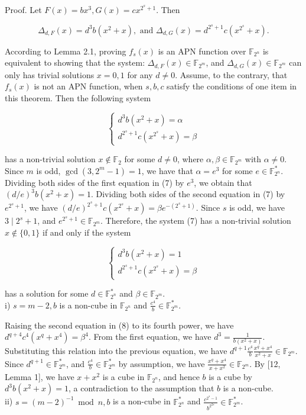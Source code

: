 \documentclass[10pt]{article}
\begin{document}
Proof. Let $F(x)=b x^{3}, G(x)=c x^{2^{s}+1}$. Then

$$
\Delta_{d, F}(x)=d^{3} b\left(x^{2}+x\right), \text { and } \Delta_{d, G}(x)=d^{2^{s}+1} c\left(x^{2^{s}}+x\right) .
$$

According to Lemma 2.1, proving $f_{s}(x)$ is an APN function over $\mathbb{F}_{2^{n}}$ is equivalent to showing that the system: $\Delta_{d, F}(x) \in \mathbb{F}_{2^{m}}$, and $\Delta_{d, G}(x) \in \mathbb{F}_{2^{m}}$ can only has trivial solutions $x=0,1$ for any $d \neq 0$. Assume, to the contrary, that $f_{s}(x)$ is not an APN function, when $s, b, c$ satisfy the conditions of one item in this theorem. Then the following system

\[
\left\{\begin{array}{l}
d^{3} b\left(x^{2}+x\right)=\alpha  \tag{7}\\
d^{2^{s}+1} c\left(x^{2^{s}}+x\right)=\beta
\end{array}\right.
\]

has a non-trivial solution $x \notin \mathbb{F}_{2}$ for some $d \neq 0$, where $\alpha, \beta \in \mathbb{F}_{2^{m}}$ with $\alpha \neq 0$.\\
Since $m$ is odd, $\operatorname{gcd}\left(3,2^{m}-1\right)=1$, we have that $\alpha=e^{3}$ for some $e \in \mathbb{F}_{2^{n}}^{*}$. Dividing both sides of the first equation in (7) by $e^{3}$, we obtain that $(d / e)^{3} b\left(x^{2}+x\right)=1$. Dividing both sides of the second equation in (7) by $e^{2^{s}+1}$, we have $(d / e)^{2^{s}+1} c\left(x^{2^{s}}+x\right)=\beta e^{-\left(2^{s}+1\right)}$. Since $s$ is odd, we have $3 \mid 2^{s}+1$, and $e^{2^{s}+1} \in \mathbb{F}_{2^{m}}$. Therefore, the system (7) has a non-trivial solution $x \notin\{0,1\}$ if and only if the system

\[
\left\{\begin{array}{l}
d^{3} b\left(x^{2}+x\right)=1  \tag{8}\\
d^{2^{s}+1} c\left(x^{2^{s}}+x\right)=\beta
\end{array}\right.
\]

has a solution for some $d \in \mathbb{F}_{2^{n}}^{*}$ and $\beta \in \mathbb{F}_{2^{m}}$.\\
i) $s=m-2, b$ is a non-cube in $\mathbb{F}_{2^{n}}$ and $\frac{c^{4}}{b} \in \mathbb{F}_{2^{m}}^{*}$.

Raising the second equation in (8) to its fourth power, we have $d^{q+4} c^{4}\left(x^{q}+x^{4}\right)=\beta^{4}$. From the first equation, we have $d^{3}=\frac{1}{b\left(x^{2}+x\right)}$. Substituting this relation into the previous equation, we have $d^{q+1} \frac{c^{4}}{b} \frac{x^{q}+x^{4}}{x^{2}+x} \in \mathbb{F}_{2^{m}}$. Since $d^{q+1} \in \mathbb{F}_{2^{m}}^{*}$, and $\frac{c^{4}}{b} \in \mathbb{F}_{2^{m}}^{*}$ by assumption, we have $\frac{x^{q}+x^{4}}{x+x^{2}} \in \mathbb{F}_{2^{m}}$. By [12, Lemma 1], we have $x+x^{2}$ is a cube in $\mathbb{F}_{2^{n}}$, and hence $b$ is a cube by $d^{3} b\left(x^{2}+x\right)=1$, a contradiction to the assumption that $b$ is a non-cube.\\
ii) $s=(m-2)^{-1} \bmod n, b$ is a non-cube in $\mathbb{F}_{2^{n}}^{*}$ and $\frac{c^{2^{s}-1}}{b^{2^{2 s}}} \in \mathbb{F}_{2^{m}}^{*}$.
\end{document}
